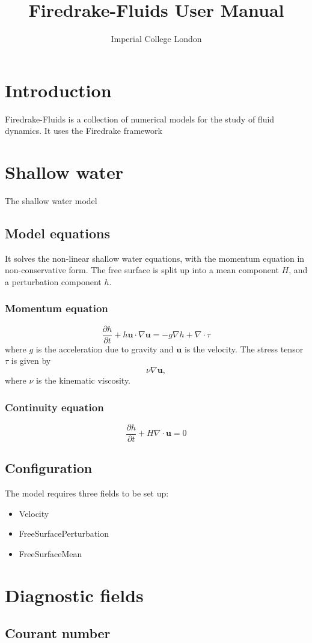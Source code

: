 \documentclass[a4paper,11pt]{report}
\title{Firedrake-Fluids User Manual}
\author{Imperial College London}
\begin{document}
\maketitle
\tableofcontents

\chapter{Introduction}
Firedrake-Fluids is a collection of numerical models for the study of fluid dynamics. It uses the Firedrake framework 

\chapter{Shallow water}
The shallow water model 

\section{Model equations}
It solves the non-linear shallow water equations, with the momentum equation in non-conservative form. The free surface is split up into a mean component $H$, and a perturbation component $h$.

\subsection{Momentum equation}
\begin{equation}
   \frac{\partial h}{\partial t} + h\mathbf{u}\cdot\nabla\mathbf{u} = -g\nabla h + \nabla\cdot\tau
\end{equation}
where $g$ is the acceleration due to gravity and $\mathbf{u}$ is the velocity. The stress tensor $\tau$ is given by 
\begin{equation}
   \nu\nabla\mathbf{u},
\end{equation}
where $\nu$ is the kinematic viscosity.

\subsection{Continuity equation}
\begin{equation}
   \frac{\partial h}{\partial t} + H\nabla\cdot\mathbf{u} = 0
\end{equation}

\section{Configuration}
The model requires three fields to be set up:
\begin{itemize}
   \item Velocity
   \item FreeSurfacePerturbation
   \item FreeSurfaceMean
\end{itemize}

\chapter{Diagnostic fields}

\section{Courant number}
\end{document}
